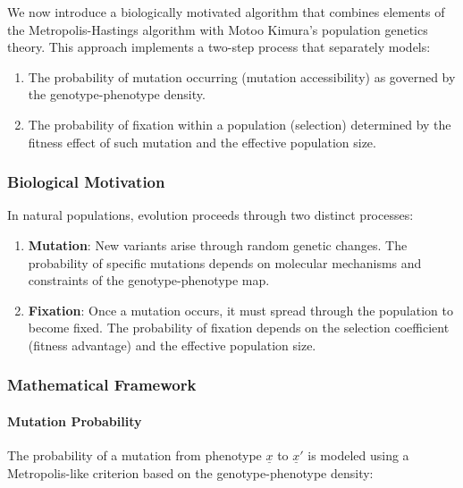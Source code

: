 \documentclass[
]{scrartcl}
\let\oldparagraph\paragraph
\renewcommand{\paragraph}[1]{\oldparagraph{#1}\mbox{}}
\providecommand{\tightlist}{%
  \setlength{\itemsep}{0pt}\setlength{\parskip}{0pt}}\usepackage{longtable,booktabs,array}
\begin{document}
We now introduce a biologically motivated algorithm that combines
elements of the Metropolis-Hastings algorithm with Motoo Kimura's
population genetics theory. This approach implements a two-step process
that separately models:

\begin{enumerate}
\def\labelenumi{\arabic{enumi}.}
\tightlist
\item
  The probability of mutation occurring (mutation accessibility) as
  governed by the genotype-phenotype density.
\item
  The probability of fixation within a population (selection) determined
  by the fitness effect of such mutation and the effective population
  size.
\end{enumerate}

\subsubsection{Biological Motivation}\label{biological-motivation}

In natural populations, evolution proceeds through two distinct
processes:

\begin{enumerate}
\def\labelenumi{\arabic{enumi}.}
\item
  \textbf{Mutation}: New variants arise through random genetic changes.
  The probability of specific mutations depends on molecular mechanisms
  and constraints of the genotype-phenotype map.
\item
  \textbf{Fixation}: Once a mutation occurs, it must spread through the
  population to become fixed. The probability of fixation depends on the
  selection coefficient (fitness advantage) and the effective population
  size.
\end{enumerate}

\subsubsection{Mathematical Framework}\label{mathematical-framework}

\paragraph{Mutation Probability}\label{mutation-probability}

The probability of a mutation from phenotype \(\underline{x}\) to
\(\underline{x}'\) is modeled using a Metropolis-like criterion based on
the genotype-phenotype density:
\end{document}
